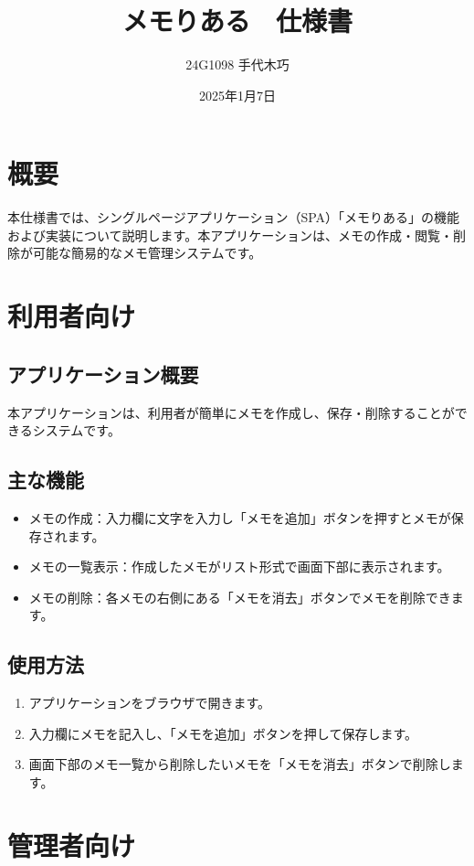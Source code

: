 \documentclass[uplatex,dvipdfmx]{jsarticle}
\begin{document}
\title{メモりある　仕様書} %
\author{24G1098 手代木巧}
\date{2025年1月7日}
\maketitle

\section{概要}
本仕様書では、シングルページアプリケーション（SPA）「メモりある」の機能および実装について説明します。本アプリケーションは、メモの作成・閲覧・削除が可能な簡易的なメモ管理システムです。

\section{利用者向け}
\subsection{アプリケーション概要}
本アプリケーションは、利用者が簡単にメモを作成し、保存・削除することができるシステムです。

\subsection{主な機能}
\begin{itemize}
    \item メモの作成：入力欄に文字を入力し「メモを追加」ボタンを押すとメモが保存されます。
    \item メモの一覧表示：作成したメモがリスト形式で画面下部に表示されます。
    \item メモの削除：各メモの右側にある「メモを消去」ボタンでメモを削除できます。
\end{itemize}

\subsection{使用方法}
\begin{enumerate}
    \item アプリケーションをブラウザで開きます。
    \item 入力欄にメモを記入し、「メモを追加」ボタンを押して保存します。
    \item 画面下部のメモ一覧から削除したいメモを「メモを消去」ボタンで削除します。
\end{enumerate}

\section{管理者向け}
\end{document}
